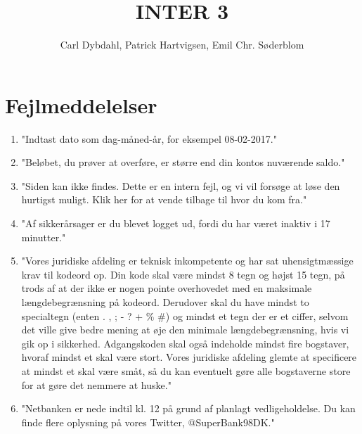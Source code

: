 \documentclass[a4paper]{article}
\title{INTER 3}
\author{Carl Dybdahl, Patrick Hartvigsen, Emil Chr. Søderblom}
\begin{document}
\maketitle

\section{Fejlmeddelelser}

\begin{enumerate}
\item "Indtast dato som dag-måned-år, for eksempel 08-02-2017."
\item "Beløbet, du prøver at overføre, er større end din kontos nuværende saldo."
\item "Siden kan ikke findes. Dette er en intern fejl, og vi vil forsøge at løse den hurtigst muligt. Klik her for at vende tilbage til hvor du kom fra."
\item "Af sikkerårsager er du blevet logget ud, fordi du har været inaktiv i 17 minutter."
\item "Vores juridiske afdeling er teknisk inkompetente og har sat uhensigtmæssige krav til kodeord op. Din kode skal være mindst 8 tegn og højst 15 tegn, på trods af at der ikke er nogen pointe overhovedet med en maksimale længdebegrænsning på kodeord. Derudover skal du have mindst to specialtegn (enten . , ; - ? + \% \#) og mindst et tegn der er et ciffer, selvom det ville give bedre mening at øje den minimale længdebegrænsning, hvis vi gik op i sikkerhed. Adgangskoden skal også indeholde mindst fire bogstaver, hvoraf mindst et skal være stort. Vores juridiske afdeling glemte at specificere at mindst et skal være småt, så du kan eventuelt gøre alle bogstaverne store for at gøre det nemmere at huske."
\item "Netbanken er nede indtil kl. 12 på grund af planlagt vedligeholdelse. Du kan finde flere oplysning på vores Twitter, @SuperBank98DK."
\end{enumerate}
\end{document}
